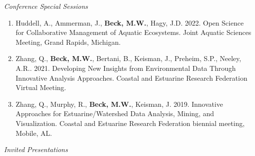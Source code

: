 \documentclass[letterpaper,12pt]{article}
\begin{document}
\vspace{\baselineskip} 
\centerline{\large{\textit{Conference Special Sessions}}}

\begin{enumerate}

\item Huddell, A., Ammerman, J., {\bf Beck, M.W.}, Hagy, J.D. 2022. Open Science for Collaborative Management of Aquatic Ecosystems. Joint Aquatic Sciences Meeting, Grand Rapids, Michigan. 

\item Zhang, Q., {\bf Beck, M.W.}, Bertani, B., Keisman, J., Preheim, S.P., Neeley, A.R.. 2021. Developing New Insights from Environmental Data Through Innovative Analysis Approaches. Coastal and Estuarine Research Federation Virtual Meeting.

\item Zhang, Q., Murphy, R., {\bf Beck, M.W.}, Keisman, J. 2019. Innovative Approaches for Estuarine/Watershed Data Analysis, Mining, and Visualization. Coastal and Estuarine Research Federation biennial meeting, Mobile, AL.

\end{enumerate}

\vspace{\baselineskip} 
\centerline{\large{\textit{Invited Presentations}}}
\end{document}
